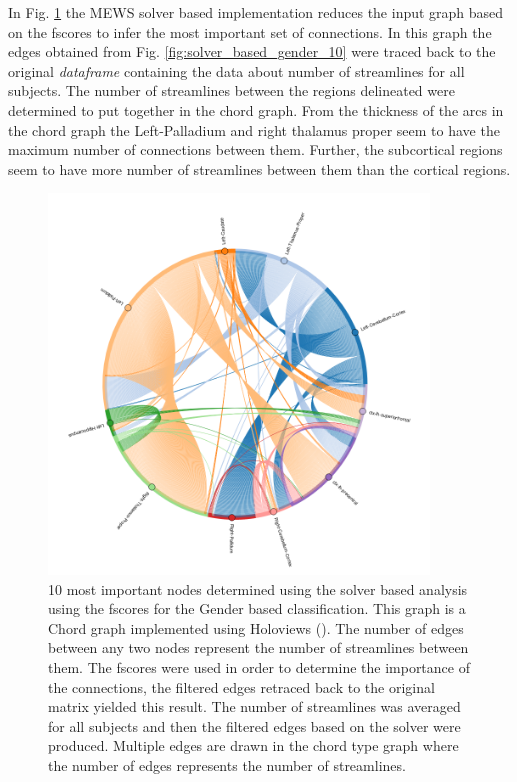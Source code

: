 \documentclass[msthesis.tex]{subfiles}
\begin{document}
In Fig. \ref{fig:gender_num_strls_10} the MEWS solver based implementation reduces the input graph based on the fscores to infer the most important set of connections. In this graph the edges obtained from Fig. \ref{fig:solver_based_gender_10} were traced back to the original \textit{dataframe} containing the data about number of streamlines for all subjects. The number of streamlines between the regions delineated were determined to put together in the chord graph. From the thickness of the arcs in the chord graph the Left-Palladium and right thalamus proper seem to have the maximum number of connections between them. Further, the subcortical regions seem to have more number of streamlines between them than the cortical regions. 
\begin{figure}
    \centering
    \includegraphics[width=0.9\textwidth]{images/gender10nodes_numstrls.png}
    \caption{10 most important nodes determined using the solver based analysis using the fscores for the Gender based classification. This graph is a Chord graph implemented using Holoviews (\cite{stevens2015holoviews}). The number of edges between any two nodes represent the number of streamlines between them. The fscores were used in order to determine the importance of the connections, the filtered edges retraced back to the original matrix yielded this result. The number of streamlines was averaged for all subjects and then the filtered edges based on the solver were produced. Multiple edges are drawn in the chord type graph where the number of edges represents the number of streamlines.}
    \label{fig:gender_num_strls_10}
\end{figure}
\end{document}
